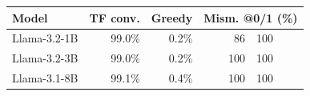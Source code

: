\begin{tabular}{l r r r@{\,/\,}l}
\toprule
Model & TF conv. & Greedy & \multicolumn{2}{c}{Mism. @0/1 (\%)} \\
\midrule
Llama-3.2-1B & 99.0\% & 0.2\% &  86 & 100 \\
Llama-3.2-3B & 99.0\% & 0.2\% & 100 & 100 \\
Llama-3.1-8B & 99.1\% & 0.4\% & 100 & 100 \\
\bottomrule
\end{tabular}
